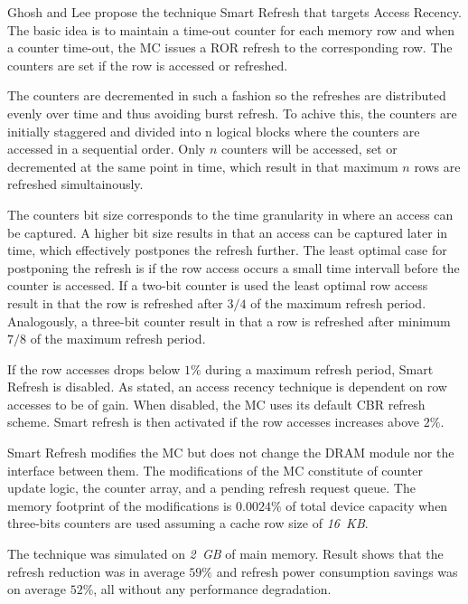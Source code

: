 Ghosh and Lee propose the technique Smart Refresh \cite{smartrefresh} that targets Access Recency. The basic idea is to maintain a time-out counter for each memory row and when a counter time-out, the MC issues a ROR refresh to the corresponding row. The counters are set if the row is accessed or refreshed.

The counters are decremented in such a fashion so the refreshes are distributed evenly over time and thus avoiding burst refresh. To achive this, the counters are initially staggered and divided into n logical blocks where the counters are accessed in a sequential order. Only $n$ counters will be accessed, set or decremented at the same point in time, which result in that maximum $n$ rows are refreshed simultainously. 

The counters bit size corresponds to the time granularity in where an access can be captured. A higher bit size results in that an access can be captured later in time, which effectively postpones the refresh further. The least optimal case for postponing the refresh is if the row access occurs a small time intervall before the counter is accessed. If a two-bit counter is used the least optimal row access result in that the row is refreshed after $3/4$ of the maximum refresh period. Analogously, a three-bit counter result in that a row is refreshed after minimum $7/8$ of the maximum refresh period.

If the row accesses drops below $1\%$ during a maximum refresh period, Smart Refresh is disabled. As stated, an access recency technique is dependent on row accesses to be of gain. When disabled, the MC uses its default CBR refresh scheme. Smart refresh is then activated if the row accesses increases above $2\%$.

Smart Refresh modifies the MC but does not change the DRAM module nor the interface between them. The modifications of the MC constitute of counter update logic, the counter array, and a pending refresh request queue. The memory footprint of the modifications is $0.0024\%$ of total device capacity when three-bits counters are used assuming a cache row size of \textit{16~KB}.

The technique was simulated on \textit{2~GB} of main memory. Result shows that the refresh reduction was in average $59\%$ and refresh power consumption savings was on average $52\%$, all without any performance degradation.